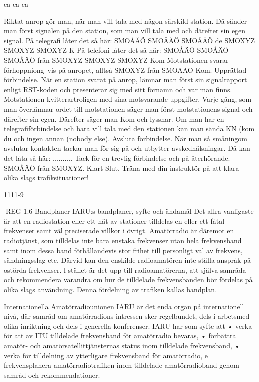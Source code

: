 \documentclass[a4paper,twoside,twocolumn,openright]{book}
\begin{document}
{{{{{ca ca ca

Riktat anrop gör man, när man vill tala med
någon särskild station. Då sänder man först
signalen på den station, som man vill tala
med och därefter sin egen signal.
På telegrafi låter det så här:
SMOÅÄÖ SMOÅÄÖ SMOÅÄÖ de SMOXYZ
SMOXYZ SMOXYZ K
På telefoni låter det så här:
SMOÅÄÖ SMOÅÄÖ SMOÅÄÖ från SMOXYZ
SMOXYZ SMOXYZ Kom
Motstationen svarar förhoppniong~vis på
anropet, alltså SMOXYZ från SMOAAO Kom.
Upprättad förbindelse. När en station svarat
på anrop, lämnar man först sin signalrapport
enligt RST-koden och presenterar sig med
sitt förnamn och var man finns. Motstationen
kvitterartroligen med sina motsvarande uppgifter. Varje gång, som man överlämnar ordet till motstationen säger man först motstationens signal och därefter sin egen. Därefter säger man Kom och lyssnar. Om man
har en telegrafiförbindelse och bara vill tala
med den stationen kan man sända KN (kom
du och ingen annan (nobody else).
Avsluta förbindelse. När man så småningom
avslutar kontakten tackar man för sig på och
utbytter avskedhälsningar.
Då kan det låta så här:
.......... Tack för en trevlig förbindelse och på
återhörande. SMOÅÄÖ från SMOXYZ. Klart
Slut.
Träna med din instruktör på att klara olika
slags trafiksituationer!

1111-9

REG
1.6 Bandplaner
IARU:s bandplaner, syfte och ändamål
Det allra vanligaste är att en radiostation eller
ett nät av stationer tilldelas en eller ett fåtal
frekvenser samt väl preciserade villkor i övrigt. Amatörradio är däremot en radiotjänst,
som tilldelas inte bara enstaka frekvenser
utan hela frekvensband samt inom dessa
band förhållandevis stor frihet till personligt
val av frekvens, sändningsslag etc.
Därvid kan den enskilde radioamatören
inte ställa anspråk på ostörda frekvenser. l
stället är det upp till radioamatörerna, att
själva samråda och rekommendera varandra om hur de tilldelade frekvensbanden bör
fördelas på olika slags användning. Denna
fördelning av trafiken kallas bandplan.

Internationella Amatörradiounionen IARU är det enda organ på internationell
nivå, där samråd om amatörradions intressen sker regelbundet, dels i arbetsmed olika inriktning och dels i
generella konferenser.
IARU har som syfte att
• verka för att av ITU tilldelade frekvensband för amatörradio bevaras,
• förbättra amatör- och amatörsatellittjänsternas status inom tilldelade
frekvensband,
• verka för tilldelning av ytterligare
frekvensband för amatörradio,
e
frekvensplanera amatörradiotrafiken
inom tilldelade amatörradioband genom samråd och rekommendationer.

}}}}}
\end{document}
